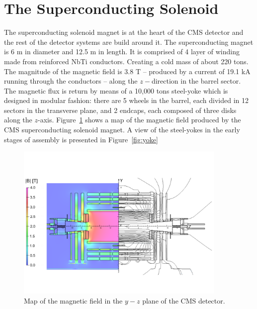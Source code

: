 \section{The Superconducting Solenoid}
The superconducting solenoid magnet is at the heart of the CMS
detector and the rest of the detector systems are build around it. The
superconducting magnet is 6 m in diameter and 12.5 m in length. It is
comprised of 4 layer of winding made from reinforced NbTi
conductors. Creating a cold mass of about 220 tons. The magnitude of
the magnetic field is 3.8 T -- produced by a  current of 19.1 kA
running through the conductors -- along the $z-$direction in the
barrel sector. The magnetic flux is return by means of a 10,000 tons
steel-yoke which is designed in modular fashion: there are 5 wheels in
the barrel, each divided in 12 sectors in the transverse plane, and 2
endcaps, each composed of three disks along the
$z$-axis. Figure~\ref{fig:BField} shows a map of the magnetic field produced
by the CMS superconducting solenoid magnet. A view of the steel-yokes
in the early stages of assembly is presented in Figure~\ref{fig:yoke}
\begin{figure}
 \centering
\includegraphics[width=0.9\textwidth]{CMS_DetectorFigures/CMS_B_Field.pdf}
\caption{Map of the magnetic field in the $y-z$ plane of the CMS detector.\label{fig:BField}}
\end{figure}
